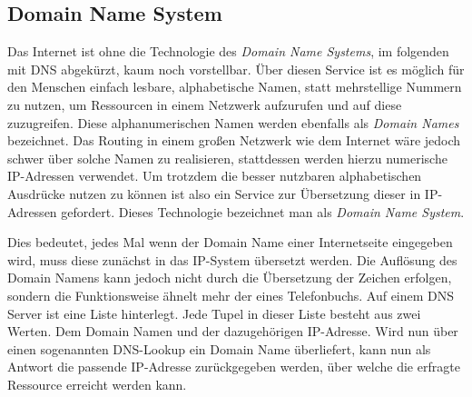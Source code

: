 \hypertarget{domain-name-system}{%
\subsection{Domain Name System}\label{domain-name-system}}

Das Internet ist ohne die Technologie des \emph{Domain Name Systems}, im
folgenden mit DNS abgekürzt, kaum noch vorstellbar. Über diesen Service
ist es möglich für den Menschen einfach lesbare, alphabetische Namen,
statt mehrstellige Nummern zu nutzen, um Ressourcen in einem Netzwerk
aufzurufen und auf diese zuzugreifen. Diese alphanumerischen Namen
werden ebenfalls als \emph{Domain Names} bezeichnet. Das Routing in
einem großen Netzwerk wie dem Internet wäre jedoch schwer über solche
Namen zu realisieren, stattdessen werden hierzu numerische IP-Adressen
verwendet. Um trotzdem die besser nutzbaren alphabetischen Ausdrücke
nutzen zu können ist also ein Service zur Übersetzung dieser in
IP-Adressen gefordert. Dieses Technologie bezeichnet man als
\emph{Domain Name System}.


Dies bedeutet, jedes Mal wenn der Domain Name einer Internetseite
eingegeben wird, muss diese zunächst in das IP-System übersetzt werden.
Die Auflösung des Domain Namens kann jedoch nicht durch die Übersetzung
der Zeichen erfolgen, sondern die Funktionsweise ähnelt mehr der eines
Telefonbuchs. Auf einem DNS Server ist eine Liste hinterlegt. Jede Tupel
in dieser Liste besteht aus zwei Werten. Dem Domain Namen und der
dazugehörigen IP-Adresse. Wird nun über einen sogenannten DNS-Lookup ein
Domain Name überliefert, kann nun als Antwort die passende IP-Adresse
zurückgegeben werden, über welche die erfragte Ressource erreicht werden
kann.
